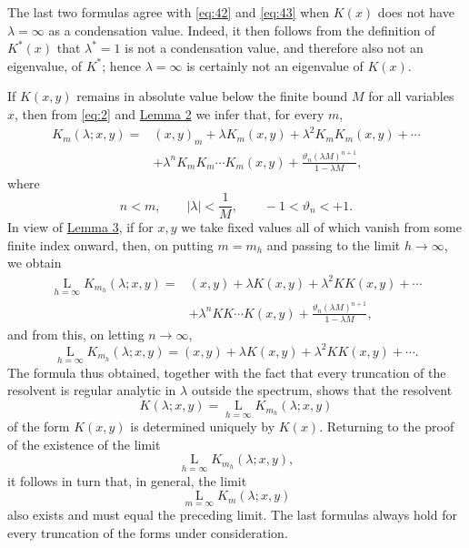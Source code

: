 \documentclass[b5paper,twoside]{article}
\newcommand{\originalpage}[1]{\phantomsection\label{origpage:#1}}
\begin{document}
The last two formulas agree with \eqref{eq:42} and \eqref{eq:43} when
$K(x)$ does not have $\lambda=\infty$ as a condensation value.  Indeed, it
then follows from the definition of $K^*(x)$ that $\lambda^*=1$ is not a
condensation value, and therefore also not an eigenvalue, of $K^*$; hence
$\lambda=\infty$ is certainly not an eigenvalue of $K(x)$.

If $K(x,y)$ remains in absolute value below the finite bound $M$ for all
variables $x$, then from \eqref{eq:2} and \hyperref[lem:2]{Lemma 2} we infer
that, for every $m$,
\[
\begin{aligned}
  K_m(\lambda;x,y)
  ={}&(x,y)_m+\lambda K_m(x,y)+\lambda^2K_mK_m(x,y)+\cdots\\
     &+\lambda^nK_mK_m\cdots K_m(x,y)
      +\frac{\vartheta_n(\lambda M)^{n+1}}{1-\lambda M},
\end{aligned}
\]
\originalpage{185}where
\[
  n<m,\qquad \lvert\lambda\rvert<\frac1M,
  \qquad -1<\vartheta_n<+1.
\]
In view of \hyperref[lem:3]{Lemma 3}, if for $x,y$ we take fixed values all
of which vanish from some finite index onward, then, on putting $m=m_h$ and
passing to the limit $h\to\infty$, we obtain
\begin{equation}
\tag{51}\label{eq:51}
\begin{aligned}
  \mathop{\mathrm{L}}\limits_{h=\infty}K_{m_h}(\lambda;x,y)
  ={}&(x,y)+\lambda K(x,y)+\lambda^2KK(x,y)+\cdots\\
     &+\lambda^nKK\cdots K(x,y)
       +\frac{\vartheta_n(\lambda M)^{n+1}}{1-\lambda M},
\end{aligned}
\end{equation}
and from this, on letting $n\to\infty$,
\[
  \mathop{\mathrm{L}}\limits_{h=\infty}K_{m_h}(\lambda;x,y)
  =(x,y)+\lambda K(x,y)+\lambda^2KK(x,y)+\cdots.
\]
The formula thus obtained, together with the fact that every truncation of
the resolvent is regular analytic in $\lambda$ outside the spectrum, shows
that the resolvent
\[
  K(\lambda;x,y)
  =\mathop{\mathrm{L}}\limits_{h=\infty}K_{m_h}(\lambda;x,y)
\]
of the form $K(x,y)$ is determined uniquely by $K(x)$.  Returning to the
proof of the existence of the limit
\[
  \mathop{\mathrm{L}}\limits_{h=\infty}K_{m_h}(\lambda;x,y),
\]
it follows in turn that, in general, the limit
\[
  \mathop{\mathrm{L}}\limits_{m=\infty}K_m(\lambda;x,y)
\]
also exists and must equal the preceding limit.  The last formulas always
hold for every truncation of the forms under consideration.
\end{document}
